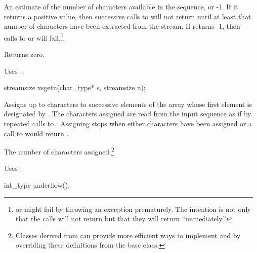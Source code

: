 \begin{itemdescr}
\pnum
\returns
An estimate of the number of
characters available in the sequence, or -1.
If it returns
a positive value, then successive calls to
will not return
until at least that number of characters have been
extracted from the stream.
If
returns -1, then calls to
or
will fail.\footnote{
or
might fail by throwing an exception prematurely.
The intention is not only that the calls will not return
but that they will return ``immediately.''}

\pnum
{}
Returns zero.

\pnum
\remarks
Uses
.
\end{itemdescr}

%
\begin{itemdecl}
streamsize xsgetn(char_type* s, streamsize n);
\end{itemdecl}

\begin{itemdescr}
\pnum
\effects
Assigns up to  characters to successive elements of
the array whose first element is designated by .
The characters assigned are read from the input sequence as if
by repeated calls to
.
Assigning stops when either  characters
have been assigned or a call to
would return
.

\pnum
\returns
The number of characters assigned.\footnote{Classes derived from
can provide more efficient ways to implement
and
by overriding these definitions from the base class.}

\pnum
\remarks
Uses
.
\end{itemdescr}

%
\begin{itemdecl}
int_type underflow();
\end{itemdecl}

